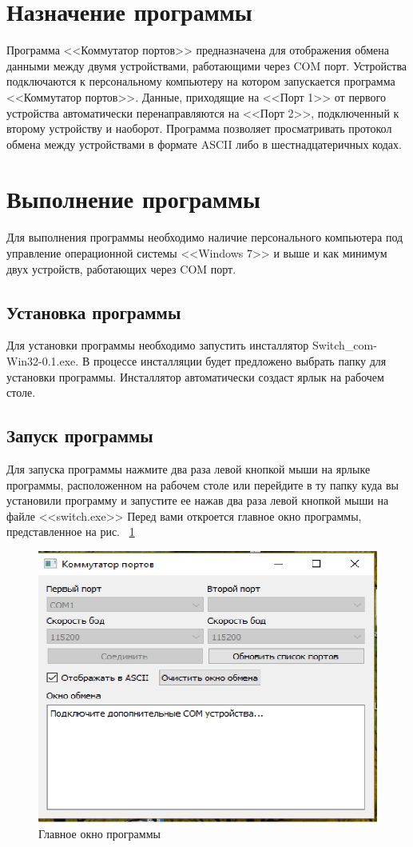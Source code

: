 \documentclass[12pt]{article}[a4paper,14pt,russian]
\begin{document}
\section{Назначение программы}
Программа <<Коммутатор портов>> предназначена для отображения обмена данными между двумя устройствами, работающими через COM порт. Устройства подключаются к персональному компьютеру на котором запускается программа <<Коммутатор портов>>. Данные, приходящие на <<Порт 1>> от первого устройства автоматически перенаправляются на <<Порт 2>>, подключенный к второму устройству и наоборот. Программа позволяет просматривать протокол обмена между устройствами в формате ASCII либо в шестнадцатеричных кодах.
\section {Выполнение программы}
Для выполнения программы необходимо наличие персонального компьютера под управление операционной системы <<Windows 7>> и выше и как минимум двух устройств, работающих через COM порт.
\subsection{Установка программы}
Для установки программы необходимо запустить инсталлятор
Switch\_com-Win32-0.1.exe. В процессе инсталляции будет предложено выбрать папку для установки программы. Инсталлятор автоматически создаст ярлык на рабочем столе.
\subsection {Запуск программы}
 Для запуска программы нажмите два раза левой кнопкой мыши на ярлыке программы, расположенном на рабочем столе или перейдите в ту папку куда вы установили программу и запустите ее нажав два раза левой кнопкой мыши на файле <<switch.exe>> Перед вами откроется главное окно программы, представленное на рис. ~\ref{ris:image}
 \begin{figure}[h!]
 	\includegraphics [scale=0.6]{MainWindow.png}
 	\caption{Главное окно программы}
 	\label{ris:image}
 \end{figure}
\end{document}
